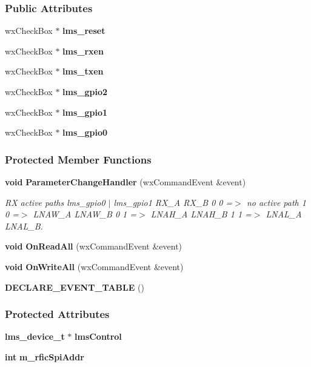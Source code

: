 \subsubsection*{Public Attributes}
\begin{DoxyCompactItemize}
\item 
wx\+Check\+Box $\ast$ {\bf lms\+\_\+reset}
\item 
wx\+Check\+Box $\ast$ {\bf lms\+\_\+rxen}
\item 
wx\+Check\+Box $\ast$ {\bf lms\+\_\+txen}
\item 
wx\+Check\+Box $\ast$ {\bf lms\+\_\+gpio2}
\item 
wx\+Check\+Box $\ast$ {\bf lms\+\_\+gpio1}
\item 
wx\+Check\+Box $\ast$ {\bf lms\+\_\+gpio0}
\end{DoxyCompactItemize}
\subsubsection*{Protected Member Functions}
\begin{DoxyCompactItemize}
\item 
{\bf void} {\bf Parameter\+Change\+Handler} (wx\+Command\+Event \&event)
\begin{DoxyCompactList}\small\item\em RX active paths lms\+\_\+gpio0 $\vert$ lms\+\_\+gpio1 R\+X\+\_\+A R\+X\+\_\+B 0 0 =$>$ no active path 1 0 =$>$ L\+N\+A\+W\+\_\+A L\+N\+A\+W\+\_\+B 0 1 =$>$ L\+N\+A\+H\+\_\+A L\+N\+A\+H\+\_\+B 1 1 =$>$ L\+N\+A\+L\+\_\+A L\+N\+A\+L\+\_\+B. \end{DoxyCompactList}\item 
{\bf void} {\bf On\+Read\+All} (wx\+Command\+Event \&event)
\item 
{\bf void} {\bf On\+Write\+All} (wx\+Command\+Event \&event)
\item 
{\bf D\+E\+C\+L\+A\+R\+E\+\_\+\+E\+V\+E\+N\+T\+\_\+\+T\+A\+B\+LE} ()
\end{DoxyCompactItemize}
\subsubsection*{Protected Attributes}
\begin{DoxyCompactItemize}
\item 
{\bf lms\+\_\+device\+\_\+t} $\ast$ {\bf lms\+Control}
\item 
{\bf int} {\bf m\+\_\+rfic\+Spi\+Addr}
\end{DoxyCompactItemize}


